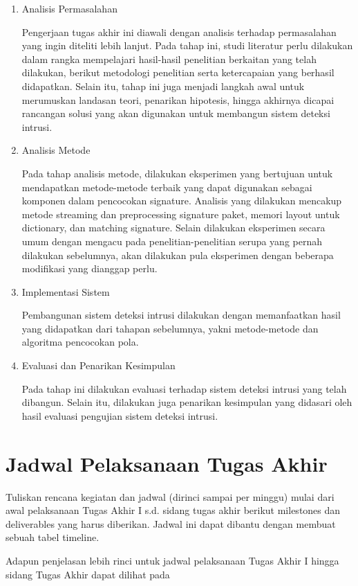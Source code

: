 \begin{enumerate}
    \item
    Analisis Permasalahan

    Pengerjaan tugas akhir ini diawali dengan analisis terhadap permasalahan yang ingin diteliti lebih lanjut. Pada tahap ini, studi literatur perlu dilakukan dalam rangka mempelajari hasil-hasil penelitian berkaitan yang telah dilakukan, berikut metodologi penelitian serta ketercapaian yang berhasil didapatkan. Selain itu, tahap ini juga menjadi langkah awal untuk merumuskan landasan teori, penarikan hipotesis, hingga akhirnya dicapai rancangan solusi yang akan digunakan untuk membangun sistem deteksi intrusi.

    \item
    Analisis Metode

    Pada tahap analisis metode, dilakukan eksperimen yang bertujuan untuk mendapatkan metode-metode terbaik yang dapat digunakan sebagai komponen dalam pencocokan signature. Analisis yang dilakukan mencakup metode streaming dan preprocessing signature paket, memori layout untuk dictionary, dan matching signature. Selain dilakukan eksperimen secara umum dengan mengacu pada penelitian-penelitian serupa yang pernah dilakukan sebelumnya, akan dilakukan pula eksperimen dengan beberapa modifikasi yang dianggap perlu.

    \item
    Implementasi Sistem

    Pembangunan sistem deteksi intrusi dilakukan dengan memanfaatkan hasil yang didapatkan dari tahapan sebelumnya, yakni metode-metode dan algoritma pencocokan pola. 

    \item
    Evaluasi dan Penarikan Kesimpulan

    Pada tahap ini dilakukan evaluasi terhadap sistem deteksi intrusi yang telah dibangun. Selain itu, dilakukan juga penarikan kesimpulan yang didasari oleh hasil evaluasi pengujian sistem deteksi intrusi.

\end{enumerate}

\section{Jadwal Pelaksanaan Tugas Akhir}

Tuliskan rencana kegiatan dan jadwal (dirinci sampai per minggu) mulai dari awal pelaksanaan Tugas Akhir I s.d. sidang tugas akhir berikut milestones dan deliverables yang harus diberikan. Jadwal ini dapat dibantu dengan membuat sebuah tabel timeline.



Adapun penjelasan lebih rinci untuk jadwal pelaksanaan Tugas Akhir I hingga sidang Tugas Akhir dapat dilihat pada 


